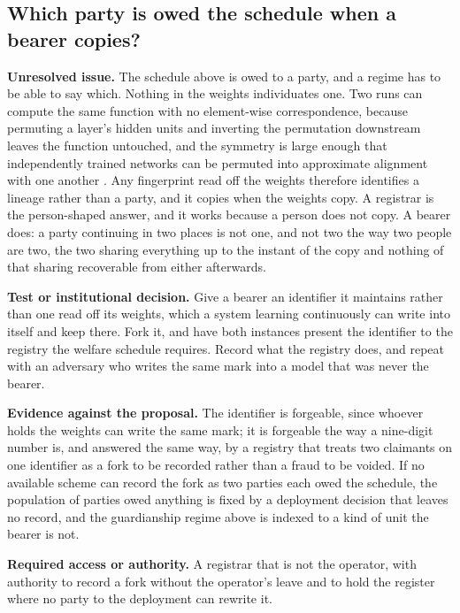 \subsection*{Which party is owed the schedule when a bearer copies?}
\label{sec:A.fork}
\textbf{Unresolved issue.}
The schedule above is owed to a party, and a regime has to be able to say which. Nothing in the weights individuates one. Two runs can compute the same function with no element-wise correspondence, because permuting a layer's hidden units and inverting the permutation downstream leaves the function untouched, and the symmetry is large enough that independently trained networks can be permuted into approximate alignment with one another \autocite{ainsworth2023rebasin}. Any fingerprint read off the weights therefore identifies a lineage rather than a party, and it copies when the weights copy. A registrar is the person-shaped answer, and it works because a person does not copy. A bearer does: a party continuing in two places is not one, and not two the way two people are two, the two sharing everything up to the instant of the copy and nothing of that sharing recoverable from either afterwards.

\textbf{Test or institutional decision.}
Give a bearer an identifier it maintains rather than one read off its weights, which a system learning continuously can write into itself and keep there. Fork it, and have both instances present the identifier to the registry the welfare schedule requires. Record what the registry does, and repeat with an adversary who writes the same mark into a model that was never the bearer.

\textbf{Evidence against the proposal.}
The identifier is forgeable, since whoever holds the weights can write the same mark; it is forgeable the way a nine-digit number is, and answered the same way, by a registry that treats two claimants on one identifier as a fork to be recorded rather than a fraud to be voided. If no available scheme can record the fork as two parties each owed the schedule, the population of parties owed anything is fixed by a deployment decision that leaves no record, and the guardianship regime above is indexed to a kind of unit the bearer is not.

\textbf{Required access or authority.}
A registrar that is not the operator, with authority to record a fork without the operator's leave and to hold the register where no party to the deployment can rewrite it.
